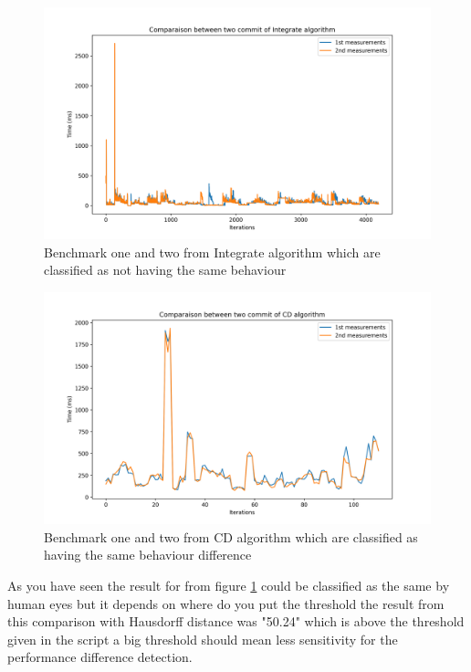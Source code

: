 \documentclass[12pt,a4paper]{article}
\begin{document}
\begin{figure}[]
    \centering
    \includegraphics[width=1\textwidth]{images/plot_Integrate_159.78600000000006.png}
    \caption{Benchmark one and two from Integrate algorithm which are classified as not having the same behaviour}
    \label{fig:bench_1_2_3}
\end{figure}


\begin{figure}[]
    \centering
    \includegraphics[width=1\textwidth]{images/plot_CD_100.56999999999994.png}
    \caption{Benchmark one and two from CD algorithm which are classified as having the same behaviour difference}
    \label{fig:bench_1_2_4}
\end{figure}


As you have seen the result for from figure \ref{fig:bench_1_2_3} could be classified as the same by human eyes but it depends on where do you put the threshold the result from this comparison with Hausdorff distance was "50.24" which is above the threshold given in the script a big threshold should mean less sensitivity for the performance difference detection.\\
\end{document}
